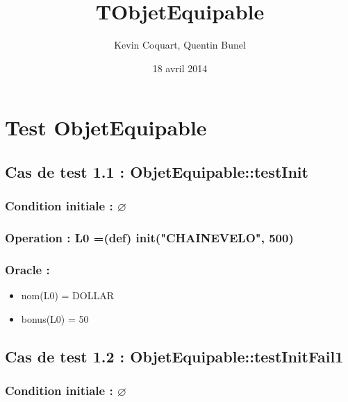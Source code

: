 \documentclass[11pt]{article}
\title{TObjetEquipable}
\author{Kevin Coquart, Quentin Bunel}
\date{18 avril 2014}
\begin{document}
\maketitle

\setcounter{tocdepth}{3}
\tableofcontents
\vspace*{1cm}
\section{Test ObjetEquipable}
\label{sec-1}


\subsection{Cas de test 1.1 : ObjetEquipable::testInit}
\label{sec-1.1}

\subsubsection{Condition initiale : $\varnothing$}
\label{sec-1.1.1}

\subsubsection{Operation : L0 =(def) init("CHAINEVELO", 500)}
\label{sec-1.1.2}

\subsubsection{Oracle :}
\label{sec-1.1.3}

\begin{itemize}

\item nom(L0) = DOLLAR\\
\label{sec-1.1.3.1}


\item bonus(L0) = 50\\
\label{sec-1.1.3.2}

  
\end{itemize} %
\subsection{Cas de test 1.2 : ObjetEquipable::testInitFail1}
\label{sec-1.2}

\subsubsection{Condition initiale : $\varnothing$}
\label{sec-1.2.1}
\end{document}
